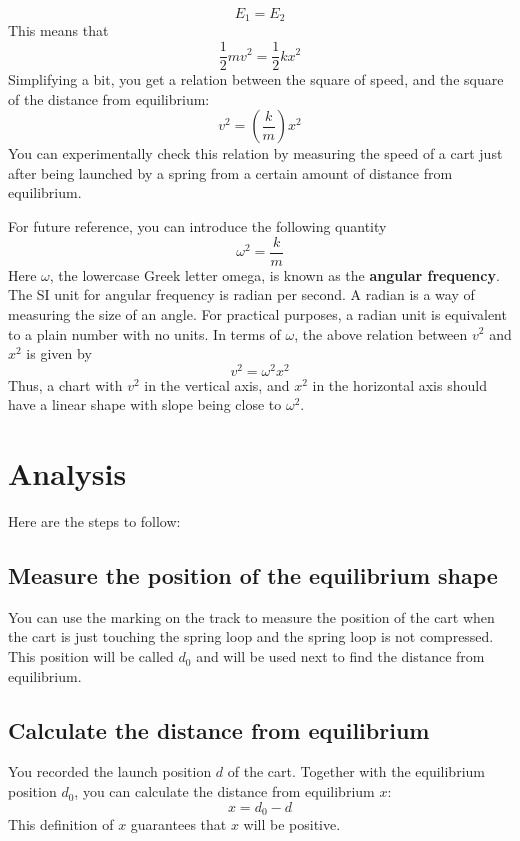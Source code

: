 \begin{equation}
    E_{1} = E_{2}
\end{equation}
This means that
\begin{equation}
    \frac{1}{2} m v^{2} = \frac{1}{2} k x^{2}
\end{equation}
Simplifying a bit, you get a relation between the square of speed, and the square of the distance from equilibrium:
\begin{equation}
    v^{2} = \left( \frac{k}{m} \right) x^{2}
\end{equation}
You can experimentally check this relation by measuring the speed of a cart just after being launched by a spring from a certain amount of distance from equilibrium.

For future reference, you can introduce the following quantity
\begin{equation}
    \omega^{2} = \frac{k}{m}
\end{equation}
Here $\omega$, the lowercase Greek letter omega, is known as the \textbf{angular frequency}. The SI unit for angular frequency is radian per second. A radian is a way of measuring the size of an angle. For practical purposes, a radian unit is equivalent to a plain number with no units. In terms of $\omega$, the above relation between $v^{2}$ and $x^{2}$ is given by
\begin{equation}
    v^{2} = \omega^{2} x^{2}
\end{equation}
Thus, a chart with $v^{2}$ in the vertical axis, and $x^{2}$ in the horizontal axis should have a linear shape with slope being close to $\omega^{2}$.
%
\section{Analysis}
%
Here are the steps to follow:
%
\subsection{Measure the position of the equilibrium shape}
%
You can use the marking on the track to measure the position of the cart when the cart is just touching the spring loop and the spring loop is not compressed. This position will be called $d_{0}$ and will be used next to find the distance from equilibrium.
%
\subsection{Calculate the distance from equilibrium}
%
You recorded the launch position $d$ of the cart. Together with the equilibrium position $d_{0}$, you can calculate the distance from equilibrium $x$:
\begin{equation}
    x = d_{0} - d
\end{equation}
This definition of $x$ guarantees that $x$ will be positive.
%
